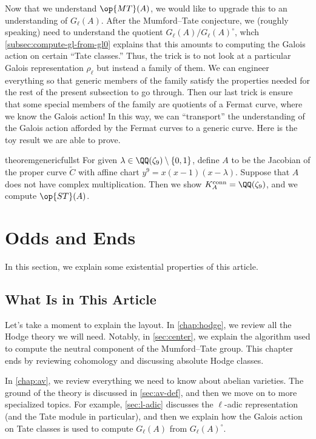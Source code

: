 \documentclass[openany]{book}
\begin{document}
Now that we understand $\op{MT}(A)$, we would like to upgrade this to an understanding of $G_\ell(A)$. After the Mumford--Tate conjecture, we (roughly speaking) need to understand the quotient $G_\ell(A)/G_\ell(A)^\circ$, whch \cref{subsec:compute-gl-from-gl0} explains that this amounts to computing the Galois action on certain ``Tate classes.'' Thus, the trick is to not look at a particular Galois representation $\rho_\ell$ but instead a family of them. We can engineer everything so that generic members of the family satisfy the properties needed for the rest of the present subsection to go through. Then our last trick is ensure that some special members of the family are quotients of a Fermat curve, where we know the Galois action! In this way, we can ``transport'' the understanding of the Galois action afforded by the Fermat curves to a generic curve. Here is the toy result we are able to prove.
\begin{restatable*}{theorem}{genericfullst}
	For given $\lambda\in\QQ(\zeta_9)\setminus\{0,1\}$, define $A$ to be the Jacobian of the proper curve $\widetilde C$ with affine chart $y^9=x(x-1)(x-\lambda)$. Suppose that $A$ does not have complex multiplication. Then we show $K_A^{\mathrm{conn}}=\QQ(\zeta_9)$, and we compute $\op{ST}(A)$.
\end{restatable*}

\section{Odds and Ends}
In this section, we explain some existential properties of this article.

\subsection{What Is in This Article}
Let's take a moment to explain the layout. In \cref{chap:hodge}, we review all the Hodge theory we will need. Notably, in \cref{sec:center}, we explain the algorithm used to compute the neutral component of the Mumford--Tate group. This chapter ends by reviewing cohomology and discussing absolute Hodge classes.

In \cref{chap:av}, we review everything we need to know about abelian varieties. The ground of the theory is discussed in \cref{sec:av-def}, and then we move on to more specialized topics. For example, \cref{sec:l-adic} discusses the $\ell$-adic representation (and the Tate module in particular), and then we explain how the Galois action on Tate classes is used to compute $G_\ell(A)$ from $G_\ell(A)^\circ$.
\end{document}
